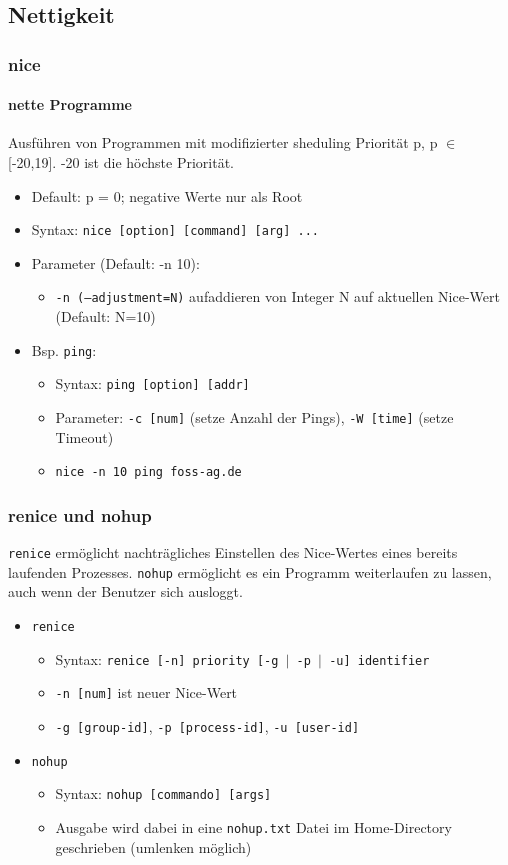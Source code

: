 \documentclass[12pt,utf8, handout]{beamer}
\begin{document}
\subsection{Nettigkeit}
\begin{frame}
\frametitle{nice}
\framesubtitle{nette Programme}
Ausführen von Programmen mit modifizierter sheduling Priorität p, p $\in$ [-20,19]. -20 ist die höchste Priorität.
\begin{itemize}[<+->]
	\item {\scriptsize Default: p = 0; negative Werte nur als Root}
	\item Syntax: \texttt{nice [option] [command] [arg] ...}
	\item Parameter (Default: -n 10):
	\begin{itemize}
		\item {\scriptsize \texttt{-n (--adjustment=N)} aufaddieren von Integer N auf aktuellen Nice-Wert (Default: N=10)}
	\end{itemize}
	\item Bsp. \texttt{ping}:
	\begin{itemize}[<+->]
		\item {\scriptsize Syntax: \texttt{ping [option] [addr]}}
		\item {\scriptsize Parameter: \texttt{-c [num]} (setze Anzahl der Pings), \texttt{-W [time]} (setze Timeout)}
		\item \texttt{nice -n 10 ping foss-ag.de}
	\end{itemize}
\end{itemize}
\end{frame}

\begin{frame}
\frametitle{renice und nohup}
\texttt{renice} ermöglicht nachträgliches Einstellen des Nice-Wertes eines bereits laufenden Prozesses.
\texttt{nohup} ermöglicht es ein Programm weiterlaufen zu lassen, auch wenn der Benutzer sich ausloggt.
\begin{itemize}
	\item \texttt{renice}
	\begin{itemize}[<+->]
		\item Syntax: \texttt{renice [-n] priority [-g $\mid$ -p $\mid$ -u] identifier}
		\item \texttt{-n [num]} ist neuer Nice-Wert
		\item \texttt{-g [group-id]}, \texttt{-p [process-id]}, \texttt{-u [user-id]}
	\end{itemize}
	\item \texttt{nohup}
	\begin{itemize}
		\item Syntax: \texttt{nohup [commando] [args]}
		\item Ausgabe wird dabei in eine \texttt{nohup.txt} Datei im Home-Directory geschrieben (umlenken möglich)
	\end{itemize}
\end{itemize}
\end{frame}
\end{document}
